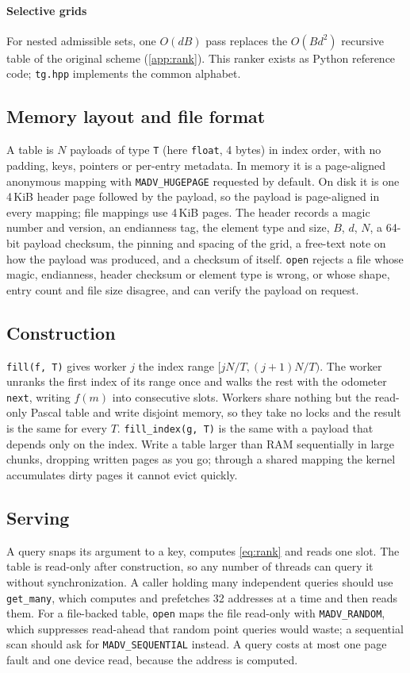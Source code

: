 \documentclass[preprint,12pt]{elsarticle}
\begin{document}
\paragraph{Selective grids} For nested admissible sets, one $O(dB)$ pass replaces the $O(Bd^2)$ recursive table of the original scheme (\ref{app:rank}). This ranker exists as Python reference code; \texttt{tg.hpp} implements the common alphabet.

\subsection{Memory layout and file format}\label{sec:layout}
A table is $N$ payloads of type \texttt{T} (here \texttt{float}, 4 bytes) in
index order, with no padding, keys, pointers or per-entry metadata. In memory it
is a page-aligned anonymous mapping with \texttt{MADV\_HUGEPAGE} requested by
default. On disk it is one 4\,KiB header page followed by the payload, so the
payload is page-aligned in every mapping; file mappings use 4\,KiB pages. The header
records a magic number and version, an endianness tag, the element type and size,
$B$, $d$, $N$, a 64-bit payload checksum, the pinning and spacing of the grid, a
free-text note on how the payload was produced, and a checksum of itself.
\texttt{open} rejects a file whose magic, endianness, header checksum or element
type is wrong, or whose shape, entry count and file size disagree, and can verify the payload on request.

\subsection{Construction}\label{sec:build}
\texttt{fill(f, T)} gives worker $j$ the index range $[jN/T,(j{+}1)N/T)$. The
worker unranks the first index of its range once and walks the rest with the
odometer \texttt{next}, writing $f(m)$ into consecutive slots. Workers share
nothing but the read-only Pascal table and write disjoint memory, so they take
no locks and the result is the same for every $T$. \texttt{fill\_index(g, T)} is the same with a payload that depends only on the index. Write a table larger than RAM sequentially in large chunks, dropping written pages as you go; through a shared mapping the kernel accumulates dirty pages it cannot evict
quickly.

\subsection{Serving}\label{sec:serve}
A query snaps its argument to a key, computes \eqref{eq:rank} and reads one
slot. The table is read-only after construction, so any number of threads can
query it without synchronization. A caller holding many independent queries should use \texttt{get\_many}, which
computes and prefetches 32 addresses at a time and then reads them. For a file-backed table, \texttt{open} maps the file
read-only with \texttt{MADV\_RANDOM}, which suppresses read-ahead that random
point queries would waste; a sequential scan should ask for
\texttt{MADV\_SEQUENTIAL} instead. A query costs at most one page fault and one device read, because the address is
computed.
\end{document}
